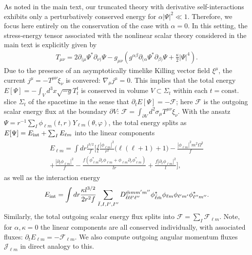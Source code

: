 \documentclass[aps,prl,notitlepage,superscriptaddress,twocolumn]{revtex4-1}
\begin{document}
As noted in the main text, our truncated theory with derivative self-interactions exhibits only a perturbatively conserved energy for $\alpha|\Psi|^2\ll 1$. Therefore, we focus here entirely on the conservation of the case with $\alpha=0$. In this setting, the stress-energy tensor associated with the nonlinear scalar theory considered in the main text is explicitly given by
\begin{align}
T_{\mu\nu}=2\partial_{(\mu}\Psi^*\partial_{\nu)}\Psi-g_{\mu\nu}\left(g^{\alpha\beta}\partial_{(\alpha}\Psi^*\partial_{\beta)}\Psi+\frac{\kappa}{2}|\Psi|^{4}\right).
\end{align}
Due to the presence of an asymptotically timelike Killing vector field $\xi^\mu$, the current $j^\mu=-T^{\mu\nu}\xi_\nu$ is convered: $\nabla_\mu j^\mu=0$. This implies that the total energy $E[\Psi]=-\int_V d^3x\sqrt{-g} T^t_t$ is conserved in volume $V\subset\Sigma_t$ within each $t=\text{const.}$ slice $\Sigma_t$ of the spacetime in the sense that $\partial_tE[\Psi]=-\mathcal{F}$; here $\mathcal{F}$ is the outgoing scalar energy flux at the boundary $\partial V$: $\mathcal{F}=\int_{\partial V} d^2\sigma_\mu T^{\mu\nu}\xi_\nu$. With the ansatz $\Psi=r^{-1}\sum_I \phi_{\ell m}(t,r)Y_{\ell m}(\theta,\varphi)$, the total energy splits as $E[\Psi]=E_{\rm int}+\sum_I E_{\ell m}$ into the linear components
\begin{align}
\begin{aligned}
E_{\ell m} = \int dr \frac{l^{3/2}}{f} \bigg[\frac{f}{l}\frac{|\phi_{\ell m}|^2}{r^2}\Big(\ell(\ell+1)+1\Big) -\frac{|\phi_{\ell m}|^2m^2\Omega^2}{f} \\
+\frac{|\partial_t\phi_{\ell m}|^2}{f} -\frac{f(\phi_{\ell m}^*\partial_r\phi_{\ell m}+\phi_{\ell m}\partial_r \phi^*_{\ell m})}{lr} +\frac{f|\partial_r \phi_{\ell m}|^2}{l}\bigg],
\end{aligned}
\end{align}
as well as the interaction energy
\begin{align}
E_{\rm int}=\int dr\frac{\kappa l^{3/2}}{2r^2f}\sum_{\bar{I},I,I',I''}D^{\bar{m}mm'm''}_{\bar{\ell}\ell \ell'\ell''} \phi^*_{\bar{\ell}\bar{m}}\phi_{\ell m}\phi_{\ell' m'}\phi^*_{\ell'' m''}.
\label{eq:Eint}
\end{align}
Similarly, the total outgoing scalar energy flux splits into $\mathcal{F}=\sum_I \mathcal{F}_{\ell m}$.
Note, for $\alpha,\kappa=0$ the linear components are all conserved individually, with associated fluxes: $\partial_t E_{\ell m}=-\mathcal{F}_{\ell m}$. We also compute outgoing angular momentum fluxes $\mathcal{J}_{\ell m}$ in direct analogy to this.
\end{document}
